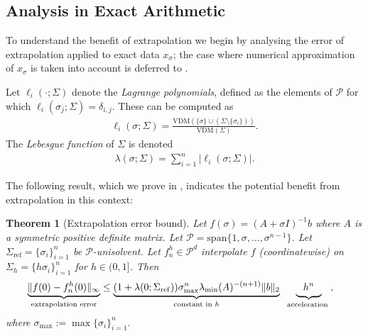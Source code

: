 \documentclass[10pt]{article} %
\newcommand{\nugget}{\sigma}
\newcommand{\nuggets}{\Sigma}
\newtheorem{theorem}{Theorem}
\begin{document}
\subsection{Analysis in Exact Arithmetic}
\label{sec: theory}

To understand the benefit of extrapolation we begin by analysing the error of extrapolation applied to exact data $x_\nugget$; the case where numerical approximation of $x_\nugget$  is taken into account is deferred to .

Let $\ell_i(\cdot  ; \nuggets)$ denote the \emph{Lagrange polynomials}, defined as the elements of $\mathcal{P}$ for which $\ell_i(\nugget_j ; \nuggets) = \delta_{i,j}$.
These can be computed as 
\begin{align*}
\ell_i(\nugget ; \nuggets) = \frac{\mathrm{VDM}(\{\nugget\} \cup (\nuggets \setminus \{\nugget_i\}))}{\mathrm{VDM}(\nuggets)} .
\end{align*}
The \emph{Lebesgue function} of $\nuggets$ is denoted
\begin{align}
\lambda(\nugget ; \nuggets) = \sum_{i=1}^n | \ell_i(\nugget ; \nuggets) | . \label{eq: leb fn}
\end{align}

\noindent The following result, which we prove in , indicates the potential benefit from extrapolation in this context:

\begin{theorem}[Extrapolation error bound]
\label{cor: extrap error}
Let $f(\nugget) = (A + \nugget I)^{-1} b$ where $A$ is a symmetric positive definite matrix.
Let $\mathcal{P} = \mathrm{span}\{1 , \nugget , \dots, \nugget^{n-1}\}$.
Let $\nuggets_{\mathrm{ref}} = \{\nugget_i\}_{i=1}^n$ be $\mathcal{P}$-unisolvent.
Let $f_n^h \in \mathcal{P}^d$ interpolate $f$ (coordinatewise) on $\nuggets_h = \{h \nugget_i\}_{i=1}^n$ for $h \in (0,1]$.
Then 
\begin{align*}
&\underbrace{ \| f(0) - f_n^h(0) \|_\infty }_{\text{\normalfont extrapolation error}} \leq \underbrace{ ( 1 + \lambda(0; \nuggets_{\mathrm{ref}}) ) \nugget_{\max}^n \lambda_{\min}(A)^{-(n+1)} \|b\|_2  }_{\text{\normalfont constant in $h$}} \; \; \underbrace{ \phantom{|_p} h^n \phantom{|_p} }_{\text{\normalfont acceleration }} ,
\end{align*}
where $\nugget_{\max} := \max\{\nugget_i\}_{i=1}^n$.
\end{theorem}
\end{document}
